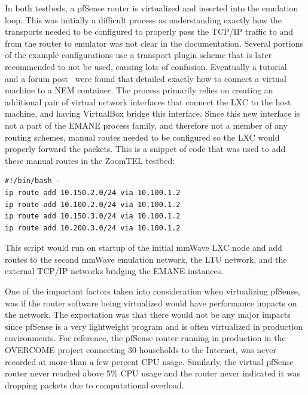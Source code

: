 In both testbeds, a pfSense router is virtualized and inserted into the emulation loop.
This was initially a difficult process as understanding exactly how the transports needed to be configured to properly pass the TCP/IP traffic to and from the router to emulator was not clear in the documentation.
Several portions of the example configurations use a transport plugin scheme that is later recommended to not be used, causing lots of confusion.
Eventually a tutorial~\cite{letce2_git} and a forum post~\cite{issues_git} were found that detailed exactly how to connect a virtual machine to a NEM container.
The process primarily relies on creating an additional pair of virtual network interfaces that connect the LXC to the host machine, and having VirtualBox bridge this interface.
Since this new interface is not a part of the EMANE process family, and therefore not a member of any routing schemes, manual routes needed to be configured so the LXC would properly forward the packets.
This is a snippet of code that was used to add these manual routes in the ZoomTEL testbed:
\begin{verbatim}
#!/bin/bash -
ip route add 10.150.2.0/24 via 10.100.1.2
ip route add 10.100.2.0/24 via 10.100.1.2
ip route add 10.150.3.0/24 via 10.100.1.2
ip route add 10.200.3.0/24 via 10.100.1.2
\end{verbatim}
This script would run on startup of the initial mmWave LXC node and add routes to the second mmWave emulation network, the LTU network, and the external TCP/IP networks bridging the EMANE instances.\par
One of the important factors taken into consideration when virtualizing pfSense, was if the router software being virtualized would have performance impacts on the network.
The expectation was that there would not be any major impacts since pfSense is a very lightweight program and is often virtualized in production environments.
For reference, the pfSense router running in production in the OVERCOME project connecting 30 households to the Internet, was never recorded at more than a few percent CPU usage.
Similarly, the virtual pfSense router never reached above 5\% CPU usage and the router never indicated it was dropping packets due to computational overload.

